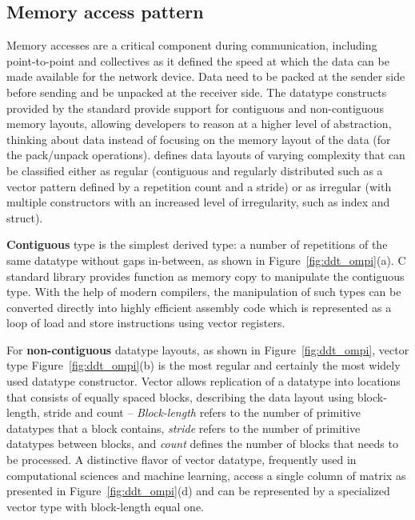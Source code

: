 \documentclass[conference]{IEEEtran}
\begin{document}
\subsection{Memory access pattern}\label{ssec:datatypes}

Memory accesses are a critical component during communication, including
point-to-point and collectives as it defined the speed at which the data can be
made available for the network device.
%
Data need to be packed at the sender side before sending and be unpacked at the
receiver side. The datatype constructs provided by the \mpi standard provide
support for contiguous and non-contiguous memory layouts, allowing developers to
reason at a higher level of abstraction, thinking about data instead of focusing
on the memory layout of the data (for the pack/unpack operations). \mpi defines
data layouts of varying complexity that can be classified either as regular
(contiguous and regularly distributed such as a vector pattern defined by a
repetition count and a stride) or as irregular (with multiple constructors with
an increased level of irregularity, such as index and struct).

{\bf Contiguous} type is the simplest derived type: a number of repetitions of
the same datatype without gaps in-between, as shown in
Figure~\ref{fig:ddt_ompi}(a). C standard library provides function as memory
copy to manipulate the contiguous type. With the help of modern compilers, the
manipulation of such types can be converted directly into highly efficient
assembly code which is represented as a loop of load and store instructions
using vector registers.

For {\bf non-contiguous} datatype layouts, as shown in Figure~\ref{fig:ddt_ompi},
vector type Figure~\ref{fig:ddt_ompi}(b) is the most regular and certainly the
most widely used \mpi datatype constructor. Vector allows replication of a
datatype into locations that consists of equally spaced blocks, describing the
data layout using block-length, stride and count -- \emph{Block-length} refers
to the number of primitive datatypes that a block contains, \emph{stride} refers
to the number of primitive datatypes between blocks, and \emph{count} defines the
number of blocks that needs to be processed.
%
A distinctive flavor of vector datatype, frequently used in computational sciences
and machine learning, access a single column of matrix as presented in
Figure~\ref{fig:ddt_ompi}(d) and can be represented by a specialized vector type
with block-length equal one.
\end{document}
